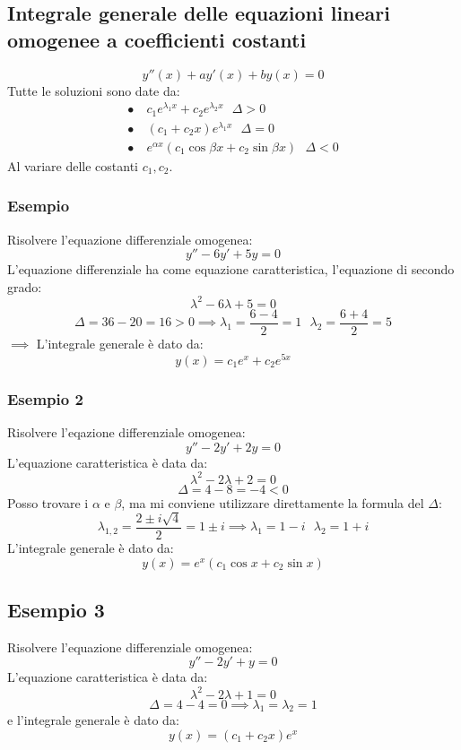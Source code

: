 \documentclass[../main.tex]{subfiles}
\begin{document}
\subsection{Integrale generale delle equazioni lineari omogenee a coefficienti costanti}
\[
    y''(x) + ay'(x) + by(x) = 0
\]
Tutte le soluzioni sono date da:
\begin{align*}
    \bullet \  & c_1e^{\lambda_1 x} + c_2e^{\lambda_2 x} \ \ \ \Delta > 0           \\
    \bullet \  & (c_1 + c_2x)e^{\lambda_1 x} \ \ \ \Delta = 0                       \\
    \bullet \  & e^{\alpha x}(c_1\cos{\beta x} + c_2\sin{\beta x}) \ \ \ \Delta < 0
\end{align*}
Al variare delle costanti $c_1, c_2$.

\subsubsection{Esempio}
Risolvere l'equazione differenziale omogenea:
\[
    y'' - 6y' + 5y = 0\]
L'equazione differenziale ha come equazione caratteristica, l'equazione di
secondo grado:
\[
    \lambda^2 - 6\lambda + 5 = 0
\]
\[
    \Delta = 36 - 20 = 16 > 0 \implies \lambda_1 = \frac{6-4}{2} = 1 \ \ \ \lambda_2 = \frac{6+4}{2} = 5
\]
$\implies$ L'integrale generale è dato da:
\[
    y(x) = c_1e^x + c_2e^{5x}
\]
\subsubsection{Esempio 2}
Risolvere l'eqazione differenziale omogenea:
\[
    y'' - 2y' + 2y = 0
\]
L'equazione caratteristica è data da:
\[
    \lambda^2 - 2\lambda + 2 = 0
\]
\[
    \Delta = 4 - 8 = -4 < 0
\]
Posso trovare i $\alpha$ e $\beta$, ma mi conviene utilizzare direttamente la
formula del $\Delta$:
\[
    \lambda_{1,2} = \frac{2 \pm i\sqrt{4}}{2} = 1 \pm i \implies \lambda_1 = 1 - i \ \ \ \lambda_2 = 1 + i
\]
L'integrale generale è dato da:
\[
    y(x) = e^x(c_1\cos{x} + c_2\sin{x})
\]

\subsection{Esempio 3}
Risolvere l'equazione differenziale omogenea:
\[
    y'' - 2y' + y = 0
\]
L'equazione caratteristica è data da:
\[
    \lambda^2 - 2\lambda + 1 = 0
\]
\[
    \Delta = 4 - 4 = 0 \implies \lambda_1 = \lambda_2 = 1
\]
e l'integrale generale è dato da:
\[
    y(x) = (c_1 + c_2x)e^x
\]
\end{document}
